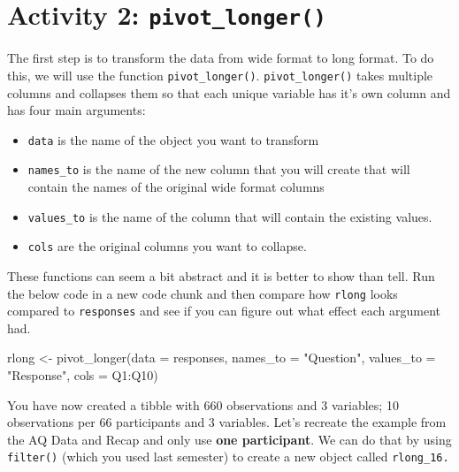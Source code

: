 \documentclass[
  oneside]{book}
\newenvironment{Shaded}{\begin{snugshade}}{\end{snugshade}}
\newcommand{\AttributeTok}[1]{\textcolor[rgb]{0.77,0.63,0.00}{#1}}
\newcommand{\FunctionTok}[1]{\textcolor[rgb]{0.00,0.00,0.00}{#1}}
\newcommand{\NormalTok}[1]{#1}
\newcommand{\OtherTok}[1]{\textcolor[rgb]{0.56,0.35,0.01}{#1}}
\newcommand{\SpecialCharTok}[1]{\textcolor[rgb]{0.00,0.00,0.00}{#1}}
\newcommand{\StringTok}[1]{\textcolor[rgb]{0.31,0.60,0.02}{#1}}
\providecommand{\tightlist}{%
  \setlength{\itemsep}{0pt}\setlength{\parskip}{0pt}}
\begin{document}
\hypertarget{activity-2-pivot_longer}{%
\section{\texorpdfstring{Activity 2: \texttt{pivot\_longer()}}{Activity 2: pivot\_longer()}}\label{activity-2-pivot_longer}}

The first step is to transform the data from wide format to long format. To do this, we will use the function \texttt{pivot\_longer()}. \texttt{pivot\_longer()} takes multiple columns and collapses them so that each unique variable has it's own column and has four main arguments:

\begin{itemize}
\tightlist
\item
  \texttt{data} is the name of the object you want to transform
\item
  \texttt{names\_to} is the name of the new column that you will create that will contain the names of the original wide format columns
\item
  \texttt{values\_to} is the name of the column that will contain the existing values.
\item
  \texttt{cols} are the original columns you want to collapse.
\end{itemize}

These functions can seem a bit abstract and it is better to show than tell. Run the below code in a new code chunk and then compare how \texttt{rlong} looks compared to \texttt{responses} and see if you can figure out what effect each argument had.

\begin{Shaded}
\begin{Highlighting}[]
\NormalTok{rlong }\OtherTok{\textless{}{-}} \FunctionTok{pivot\_longer}\NormalTok{(}\AttributeTok{data =}\NormalTok{ responses, }
                      \AttributeTok{names\_to =} \StringTok{"Question"}\NormalTok{,  }
                      \AttributeTok{values\_to =} \StringTok{"Response"}\NormalTok{,}
                      \AttributeTok{cols =}\NormalTok{ Q1}\SpecialCharTok{:}\NormalTok{Q10)}
\end{Highlighting}
\end{Shaded}

You have now created a tibble with 660 observations and 3 variables; 10 observations per 66 participants and 3 variables. Let's recreate the example from the AQ Data and Recap and only use \textbf{one participant}. We can do that by using \texttt{filter()} (which you used last semester) to create a new object called \texttt{rlong\_16.}
\end{document}
